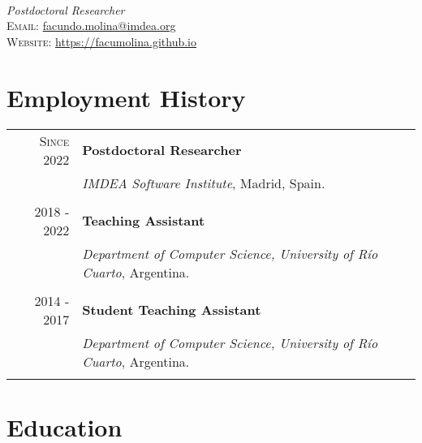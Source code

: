 \documentclass[a4paper,10pt]{article} %
\begin{document}
\pagestyle{empty} %


{} \\
\textit{Postdoctoral Researcher} \\
\textsc{Email:} \href{mailto:facundo.molina@imdea.org}{facundo.molina@imdea.org} \\
\textsc{Website:} \href{https://facumolina.github.io}{https://facumolina.github.io}


\section{Employment History}

\begin{tabular}{rl}
\\
\textsc{Since 2022}     & \textbf{Postdoctoral Researcher} \\
& \textit{IMDEA Software Institute}, Madrid, Spain. \\ & \\

\textsc{2018 - 2022} & \textbf{Teaching Assistant} \\ & \textit{Department of Computer Science, University of Río Cuarto}, Argentina. \\ & \\

\textsc{2014 - 2017} & \textbf{Student Teaching Assistant} \\
& \textit{Department of Computer Science, University of Río Cuarto}, Argentina. \\ & \\
\end{tabular}


\section{Education}
\end{document}
